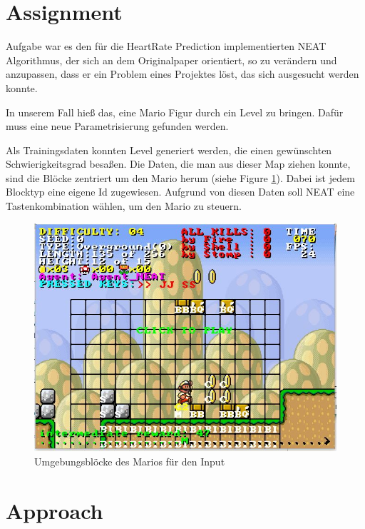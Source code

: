 \documentclass{hbrs-ecta-report}
\begin{document}
\FloatBarrier
\newpage
\newpage
\section{Assignment}
Aufgabe war es den für die HeartRate Prediction implementierten NEAT Algorithmus, der sich an dem Originalpaper \cite{Stanley2002a} orientiert, so zu verändern und anzupassen, dass er ein Problem eines Projektes löst, das sich ausgesucht werden konnte. 

In unserem Fall hieß das, eine Mario Figur durch ein Level zu bringen. Dafür muss eine neue Parametrisierung gefunden werden.

Als Trainingsdaten konnten Level generiert werden, die einen gewünschten Schwierigkeitsgrad besaßen. Die Daten, die man aus dieser Map ziehen konnte, sind die Blöcke zentriert um den Mario herum (siehe Figure \ref{fig:MarioInput}). Dabei ist jedem Blocktyp eine eigene Id zugewiesen. Aufgrund von diesen Daten soll NEAT eine Tastenkombination wählen, um den Mario zu steuern.

\begin{figure}[h!]
	\centering
	\includegraphics[width=\linewidth]{img/MarioInput.jpg}
	\caption{Umgebungsblöcke des Marios für den Input}
	\label{fig:MarioInput} 
\end{figure}

\FloatBarrier
\section{Approach}
\end{document}
